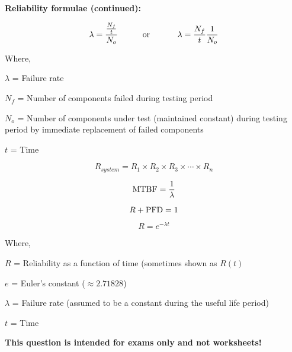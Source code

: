 \filbreak

\noindent
{\bf Reliability formulae (continued):}

$$\lambda = {{N_f \over t} \over N_o} \hbox{\hskip 30pt or \hskip 30pt} \lambda = {{N_f \over t} {1 \over N_o}}$$

\noindent
Where,

$\lambda$ = Failure rate

$N_f$ = Number of components failed during testing period

$N_o$ = Number of components under test (maintained constant) during testing period by immediate replacement of failed components

$t$ = Time

\vskip 10pt


$$R_{system} = R_1 \times R_2 \times R_3 \times \cdots \times R_n$$

$$\hbox{MTBF} = {1 \over \lambda}$$

$$R + \hbox{PFD} = 1$$

\vskip 10pt

$$R = e^{-\lambda t}$$

\noindent
Where,

$R$ = Reliability as a function of time (sometimes shown as $R(t)$

$e$ = Euler's constant ($\approx 2.71828$)

$\lambda$ = Failure rate (assumed to be a constant during the useful life period)

$t$ = Time

\vskip 10pt















{\bf This question is intended for exams only and not worksheets!}



